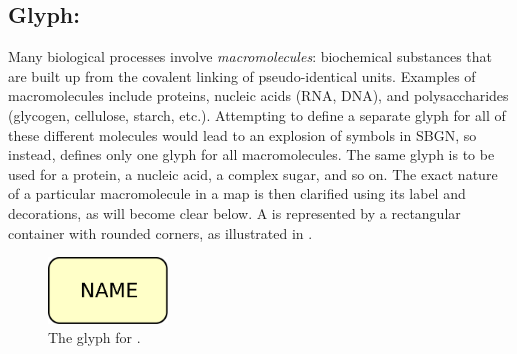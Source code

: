 
\subsection{Glyph: }
\label{sec:macromolecule}

Many biological processes involve \emph{macromolecules}: biochemical substances that are built up from the covalent linking of pseudo-identical units.  Examples of macromolecules include proteins, nucleic acids (RNA, DNA), and polysaccharides (glycogen, cellulose, starch, etc.).  Attempting to define a separate glyph for all of these different molecules would lead to an explosion of symbols in SBGN, so instead, \SBGNPDLone defines only one glyph for all macromolecules.  The same glyph is to be used for a protein, a nucleic acid, a complex sugar, and so on.  The exact nature of a particular macromolecule in a map is then clarified using its label and decorations, as will become clear below.  A  is represented by a rectangular container with rounded corners, as illustrated in . 

\begin{figure}[H]
  \centering
  \includegraphics[width = 1.25in]{images/macromolecule-plain}
  \caption{The \PD glyph for .}
  \label{fig:macromolecule}
\end{figure}





